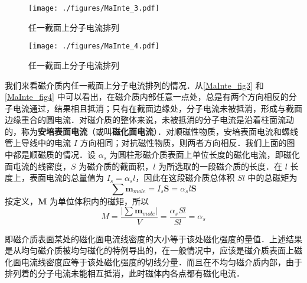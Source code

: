 \begin{figure}[ht]
\centering
\texttt{[image: ./figures/MaInte\_3.pdf]}
\caption{任一截面上分子电流排列} \label{MaInte_fig3}
\end{figure}
\begin{figure}[ht]
\centering
\texttt{[image: ./figures/MaInte\_4.pdf]}
\caption{任一截面上分子电流排列} \label{MaInte_fig4}
\end{figure}
我们来看磁介质内任一截面上分子电流排列的情况．从\autoref{MaInte_fig3} 和\autoref{MaInte_fig4} 中可以看出，在磁介质内部任意一点处，总是有两个方向相反的分子电流通过，结果相且抵消；只有在截面边缘处，分子电流未被抵消，形成与截面边缘重合的圆电流．对磁介质的整体来说，未被抵消的分子电流是沿着柱面流动的，称为\textbf{安培表面电流}（或叫\textbf{磁化面电流}）．对顺磁性物质，安培表面电流和螺线管上导线中的电流 $I$ 方向相同；对抗磁性物质，则两者方向相反．我们上面的图中都是顺磁质的情况．设 $\alpha_s$ 为圆柱形磁介质表面上单位长度的磁化电流，即磁化面屯流的线密度，$S$ 为磁介质的截面积，$ l $ 为所选取的一段磁介质的长度．在 $l $ 长度上，表面电流的总量值为 $I_s=\alpha_sl$，因此在这段磁介质总体积 $Sl$ 中的总磁矩为
\begin{equation}
\sum \mathbf{m}_{mole}=I_{s} \mathbf S=\alpha_{s} l \mathbf S
\end{equation}
按定义，$\mathbf  M $ 为单位体积内的磁矩，所以
\begin{equation}
M=\frac{\left|\sum \mathbf  m_{mole}\right|}{V}=\frac{\alpha_{s} S l}{S l}=\alpha_s
\end{equation}

即磁介质表面某处的磁化面电流线密度的大小等于该处磁化强度的量值．上述结果是从均匀磁介质被均匀磁化的特例导出的，在一般情况中，应该是磁介质表面上磁化面电流线密度应等于该处磁化强度的切线分量．而且在不均匀磁介质内部，由于排列着的分子电流未能相互抵消，此时磁体内各点都有磁化电流．


